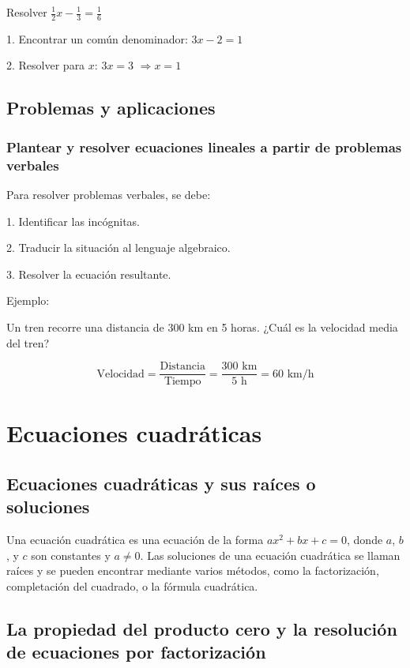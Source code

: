Resolver \( \frac{1}{2}x - \frac{1}{3} = \frac{1}{6} \)

1. Encontrar un común denominador: \(3x - 2 = 1\)

2. Resolver para \(x\): \(3x = 3\) \(\Rightarrow x = 1\)

\subsection{Problemas y aplicaciones}

\subsubsection{Plantear y resolver ecuaciones lineales a partir de problemas verbales}

Para resolver problemas verbales, se debe:

1. Identificar las incógnitas.

2. Traducir la situación al lenguaje algebraico.

3. Resolver la ecuación resultante.

Ejemplo:

Un tren recorre una distancia de 300 km en 5 horas. ¿Cuál es la velocidad media del tren?

\[ \text{Velocidad} = \frac{\text{Distancia}}{\text{Tiempo}} = \frac{300 \text{ km}}{5 \text{ h}} = 60 \text{ km/h} \]


\section{Ecuaciones cuadráticas} %

\subsection{Ecuaciones cuadráticas y sus raíces o soluciones}

Una ecuación cuadrática es una ecuación de la forma \( ax^2 + bx + c = 0 \), donde \( a \), \( b \), y \( c \) son constantes y \( a \neq 0 \). Las soluciones de una ecuación cuadrática se llaman raíces y se pueden encontrar mediante varios métodos, como la factorización, completación del cuadrado, o la fórmula cuadrática.

\subsection{La propiedad del producto cero y la resolución de ecuaciones por factorización}

